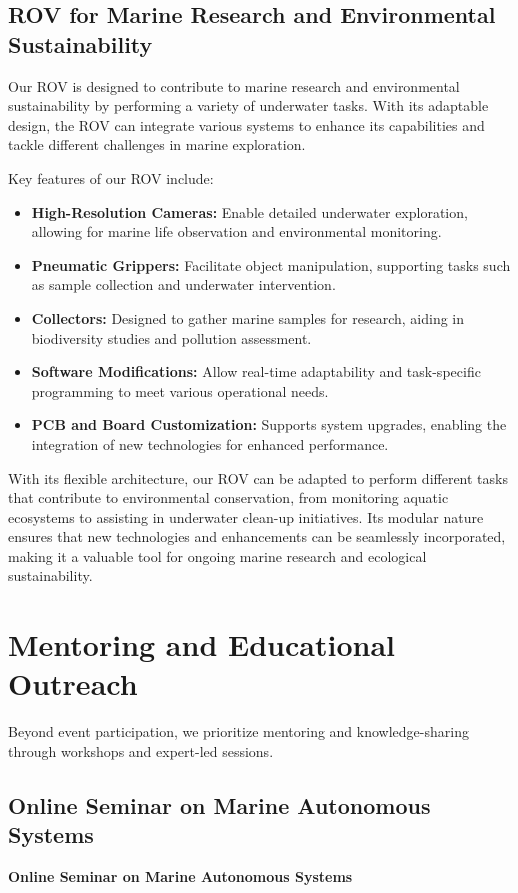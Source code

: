 \documentclass[a4paper,12pt]{article}
\begin{document}
\subsection{ROV for Marine Research and Environmental Sustainability}

Our ROV is designed to contribute to marine research and environmental sustainability by performing a variety of underwater tasks. With its adaptable design, the ROV can integrate various systems to enhance its capabilities and tackle different challenges in marine exploration. 

Key features of our ROV include:
\begin{itemize}
    \item \textbf{High-Resolution Cameras:} Enable detailed underwater exploration, allowing for marine life observation and environmental monitoring.
    \item \textbf{Pneumatic Grippers:} Facilitate object manipulation, supporting tasks such as sample collection and underwater intervention.
    \item \textbf{Collectors:} Designed to gather marine samples for research, aiding in biodiversity studies and pollution assessment.
    \item \textbf{Software Modifications:} Allow real-time adaptability and task-specific programming to meet various operational needs.
    \item \textbf{PCB and Board Customization:} Supports system upgrades, enabling the integration of new technologies for enhanced performance.
\end{itemize}

With its flexible architecture, our ROV can be adapted to perform different tasks that contribute to environmental conservation, from monitoring aquatic ecosystems to assisting in underwater clean-up initiatives. Its modular nature ensures that new technologies and enhancements can be seamlessly incorporated, making it a valuable tool for ongoing marine research and ecological sustainability.



\newpage
\section{Mentoring and Educational Outreach}
Beyond event participation, we prioritize mentoring and knowledge-sharing through workshops and expert-led sessions.

\subsection{Online Seminar on Marine Autonomous Systems}
\textbf{Online Seminar on Marine Autonomous Systems}
\end{document}
